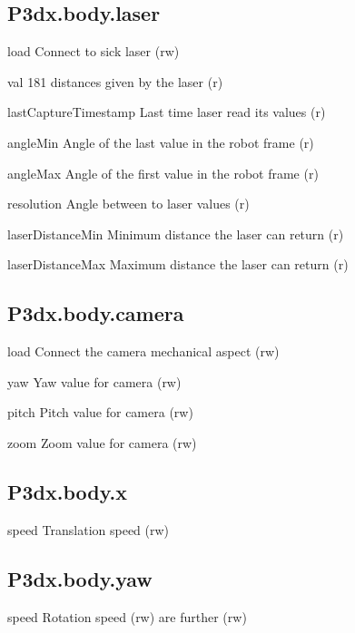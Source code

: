 \subsection{P3dx.body.laser}

\begin{urbiscriptapi}
\item[load] Connect to sick laser (rw)
\item[val] 181 distances given by the laser (r)
\item[lastCaptureTimestamp] Last time laser read its values (r)
\item[angleMin] Angle of the last value in the robot frame (r)
\item[angleMax] Angle of the first value in the robot frame (r)
\item[resolution] Angle between to laser values (r)
\item[laserDistanceMin] Minimum distance the laser can return (r)
\item[laserDistanceMax] Maximum distance the laser can return (r)
\end{urbiscriptapi}


\subsection{P3dx.body.camera}

\begin{urbiscriptapi}
\item[load] Connect the camera mechanical aspect (rw)
\item[yaw] Yaw value for camera (rw)
\item[pitch] Pitch value for camera (rw)
\item[zoom] Zoom value for camera (rw)
\end{urbiscriptapi}

\subsection{P3dx.body.x}
\begin{urbiscriptapi}
\item[speed] Translation speed (rw)
\end{urbiscriptapi}

\subsection{P3dx.body.yaw}
\begin{urbiscriptapi}
\item[speed] Rotation speed (rw) are further (rw)
\end{urbiscriptapi}

